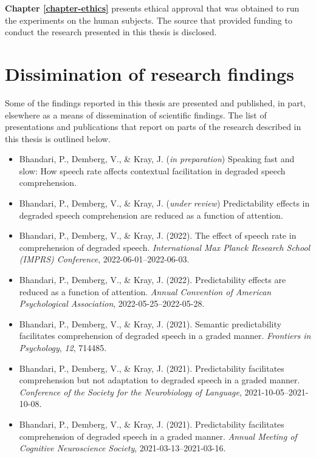 \documentclass[a4paper, nobind]{templates/ociamthesis}
\providecommand{\tightlist}{%
  \setlength{\itemsep}{0pt}\setlength{\parskip}{0pt}}
\begin{document}
\noindent
\textbf{Chapter \ref{chapter-ethics}} presents ethical approval that was obtained to run the experiments on the human subjects.
The source that provided funding to conduct the research presented in this thesis is disclosed.

\hypertarget{dissimination-of-research-findings}{%
\section{Dissimination of research findings}\label{dissimination-of-research-findings}}

Some of the findings reported in this thesis are presented and published, in part, elsewhere as a means of dissemination of scientific findings.
The list of presentations and publications that report on parts of the research described in this thesis is outlined below.

\begin{itemize}
\item
  Bhandari, P., Demberg, V., \& Kray, J. (\emph{in preparation}) Speaking fast and slow: How speech rate affects contextual facilitation in degraded speech comprehension.
\item
  Bhandari, P., Demberg, V., \& Kray, J. (\emph{under review}) Predictability effects in degraded speech comprehension are reduced as a function of attention.
\item
  Bhandari, P., Demberg, V., \& Kray, J. (2022). The effect of speech rate in comprehension of degraded speech. \emph{International Max Planck Research School (IMPRS) Conference}, 2022-06-01--2022-06-03.
\item
  Bhandari, P., Demberg, V., \& Kray, J. (2022). Predictability effects are reduced as a function of attention. \emph{Annual Convention of American Psychological Association}, 2022-05-25--2022-05-28.
\item
  Bhandari, P., Demberg, V., \& Kray, J. (2021). Semantic predictability facilitates comprehension of degraded speech in a graded manner. \emph{Frontiers in Psychology}, \emph{12}, 714485.
\item
  Bhandari, P., Demberg, V., \& Kray, J. (2021). Predictability facilitates comprehension but not adaptation to degraded speech in a graded manner. \emph{Conference of the Society for the Neurobiology of Language}, 2021-10-05--2021-10-08.
\end{itemize}

\begin{itemize}
\tightlist
\item
  Bhandari, P., Demberg, V., \& Kray, J. (2021). Predictability facilitates comprehension of degraded speech in a graded manner. \emph{Annual Meeting of Cognitive Neuroscience Society}, 2021-03-13--2021-03-16.
\end{itemize}
\end{document}
